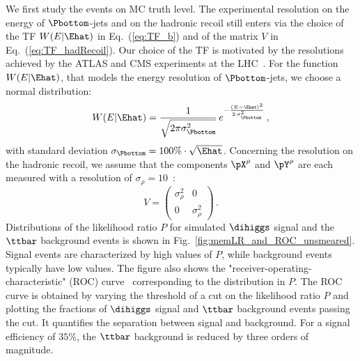 We first study the events on MC truth level.
The experimental resolution on the energy of $\Pbottom$-jets and on the hadronic recoil still enters via the choice of the TF $W(E|\Ehat)$ in Eq.~(\ref{eq:TF_b})
and of the matrix $V$ in Eq.~(\ref{eq:TF_hadRecoil}).
Our choice of the TF is motivated by the resolutions achieved by the ATLAS and CMS experiments at the LHC~\cite{Aaboud:2017aca,PRF-14-001,Aaboud:2018tkc,JME-17-001}.
For the function $W(E|\Ehat)$, that models the energy resolution of $\Pbottom$-jets,
we choose a normal distribution:
\begin{equation}
W(E|\Ehat) = \frac{1}{\sqrt{2 \pi \sigma_{\Pbottom}^{2}}} \, e^{-\frac{(E - \Ehat)^{2}}{2 \, \sigma_{\Pbottom}^{2}}} \, ,
\label{eq:resolution_b}
\end{equation}
with standard deviation $\sigma_{\Pbottom} = 100\% \cdot \sqrt{\Ehat}$.
Concerning the resolution on the hadronic recoil,
we assume that the components $\pX^{\rho}$ and $\pY^{\rho}$ are each measured with a resolution of $\sigma_{\rho} = 10$~\GeV:
\begin{equation}
V = \left( \begin{array}{cc} \sigma_{\rho}^{2} & 0 \\ 0 & \sigma_{\rho}^{2} \end{array} \right) \, .
\label{eq:resolution_rho}
\end{equation}
Distributions of the likelihood ratio $P$ for simulated $\dihiggs$ signal and the $\ttbar$ background events is shown in Fig.~\ref{fig:memLR_and_ROC_unsmeared}.
Signal events are characterized by high values of $P$, while background events typically have low values.
The figure also shows the "receiver-operating-characteristic" (ROC) curve~\cite{ROCcurve} corresponding to the distribution in $P$.
The ROC curve is obtained by varying the threshold of a cut on the likelihood ratio $P$
and plotting the fractions of $\dihiggs$ signal and $\ttbar$ background events passing the cut.
It quantifies the separation between signal and background.
For a signal efficiency of $35\%$, the $\ttbar$ background is reduced by three orders of magnitude.

